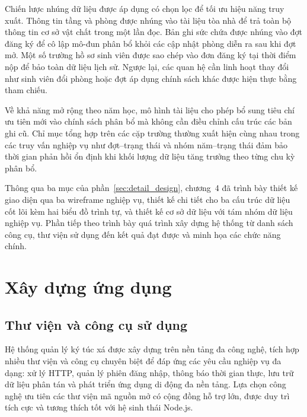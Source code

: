 \documentclass[../DoAn.tex]{subfiles}
\begin{document}
Chiến lược nhúng dữ liệu được áp dụng có chọn lọc để tối ưu hiệu năng truy xuất.
Thông tin tầng và phòng được nhúng vào tài liệu tòa nhà để trả toàn bộ thông
tin cơ sở vật chất trong một lần đọc. Bản ghi sức chứa được nhúng vào đợt đăng
ký để cô lập mô-đun phân bổ khỏi các cập nhật phòng diễn ra sau khi đợt mở. Một
số trường hồ sơ sinh viên được sao chép vào đơn đăng ký tại thời điểm nộp để
bảo toàn dữ liệu lịch sử. Ngược lại, các quan hệ cần linh hoạt thay đổi như
sinh viên đổi phòng hoặc đợt áp dụng chính sách khác được hiện thực bằng tham
chiếu.

Về khả năng mở rộng theo năm học, mô hình tài liệu cho phép bổ sung tiêu chí
ưu tiên mới vào chính sách phân bổ mà không cần điều chỉnh cấu trúc các bản ghi
cũ. Chỉ mục tổng hợp trên các cặp trường thường xuất hiện cùng nhau trong các
truy vấn nghiệp vụ như đợt--trạng thái và nhóm năm--trạng thái đảm bảo thời
gian phản hồi ổn định khi khối lượng dữ liệu tăng trưởng theo từng chu kỳ phân
bổ.

Thông qua ba mục của phần~\ref{sec:detail_design}, chương~4 đã trình bày thiết
kế giao diện qua ba wireframe nghiệp vụ, thiết kế chi tiết cho ba cấu trúc dữ
liệu cốt lõi kèm hai biểu đồ trình tự, và thiết kế cơ sở dữ liệu với tám nhóm
dữ liệu nghiệp vụ. Phần tiếp theo trình bày quá trình xây dựng hệ thống từ danh
sách công cụ, thư viện sử dụng đến kết quả đạt được và minh họa các chức năng
chính.

\section{Xây dựng ứng dụng}
\label{sec:implementation}

\subsection{Thư viện và công cụ sử dụng}
\label{subsec:tools}

Hệ thống quản lý ký túc xá được xây dựng trên nền tảng đa công nghệ, tích hợp
nhiều thư viện và công cụ chuyên biệt để đáp ứng các yêu cầu nghiệp vụ đa dạng:
xử lý HTTP, quản lý phiên đăng nhập, thông báo thời gian thực, lưu trữ dữ liệu
phân tán và phát triển ứng dụng di động đa nền tảng. Lựa chọn công nghệ ưu tiên
các thư viện mã nguồn mở có cộng đồng hỗ trợ lớn, được duy trì tích cực và
tương thích tốt với hệ sinh thái Node.js.
\end{document}

